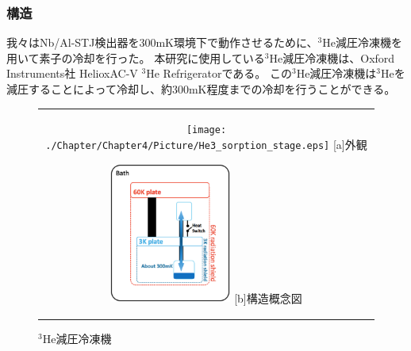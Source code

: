 			\subsubsection{構造}
				我々はNb/Al-STJ検出器を300mK環境下で動作させるために、$\mathrm{^{3}He}$減圧冷凍機を用いて素子の冷却を行った。
				本研究に使用している$\mathrm{^{3}He}$減圧冷凍機は、Oxford Instruments社 HelioxAC-V $\mathrm{^{3}}$He Refrigeratorである。
				この$\mathrm{^{3}He}$減圧冷凍機は$\mathrm{^{3}He}$を減圧することによって冷却し、約300mK程度までの冷却を行うことができる。
								
				\begin{figure}[htbp]
					\begin{center}
						\begin{tabular}{c}
							\begin{minipage}{0.6\hsize}
								\begin{center}
									\texttt{[image: ./Chapter/Chapter4/Picture/He3\_sorption\_stage.eps]}
									\hspace{1.6cm} [a]外観
								\end{center}
							\end{minipage}
							\begin{minipage}{0.4\hsize}
								\begin{center}
									\includegraphics[clip, width=4cm]{./Chapter/Chapter4/Picture/He3sorption_structure.eps}
									\hspace{1.6cm} [b]構造概念図
								\end{center}
							\end{minipage}
						\end{tabular}
						\caption{$\mathrm{^{3}He}$減圧冷凍機}
						\label{fig:He3sorption}
					\end{center}
				\end{figure}
				
